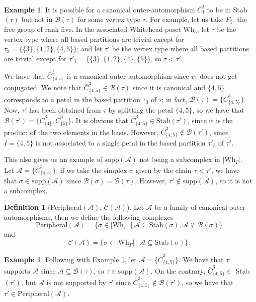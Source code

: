 \documentclass[a4paper]{amsart}
\newcommand{\G}{\Gamma}
\newcommand{\B}{\mathcal{B}}
\newcommand{\au}{\mathcal{A}}
\newcommand{\Wh}{\mathrm{Wh}}
\newcommand{\supp}{\mathrm{supp}}
\newcommand{\peri}{\mathrm{Peripheral}}
\newcommand{\Stab}{\mathrm{Stab}}
\theoremstyle{definition}
\newtheorem{defi}[teo]{Definition}
\newtheorem{ej}[teo]{Example}
\theoremstyle{remark}
\begin{document}
\begin{ej}
    It is possible for a canonical outer-automorphism $\bar{C}_{I}^j$ to be in Stab$(\tau)$ but not in $\B(\tau)$ for some vertex type $\tau$. For example, let us take $F_5$, the free group  of rank five. In the associated Whitehead poset $\Wh_5$, let $\tau$ be the vertex type where all  based partitions are trivial except for $\tau_3=\{\{3\},\{1,2\},\{4,5\}\}$; and let $\tau'$ be the vertex type where all  based partitions are trivial except for $\tau'_3=\{\{3\},\{1,2\},\{4\},\{5\}\}$, so $\tau<\tau'$. 
    
    We have that $\bar{C}_{\{4,5\}}^3$ is a canonical outer-automorphism since $v_1$ does not get conjugated. We note that $\bar{C}_{\{4,5\}}^3\in\B(\tau)$ since it is canonical and $\{4,5\}$ corresponds to a petal in the based partition $\tau_3$ of $\tau$; in fact, $\B(\tau)=\{\bar{C}_{\{4,5\}}^3\}$. Now, $\tau'$ has been obtained from $\tau$ by splitting the petal $\{4,5\}$, so we have that $\B(\tau')=\{\bar{C}_{\{4\}}^3,\bar{C}_{\{5\}}^3\}$. It is obvious that $\bar{C}_{\{4,5\}}^3\in\Stab(\tau')$, since it is the product of the two elements in the basis. However, $\bar{C}_{\{4,5\}}^3\notin\B(\tau')$, since $I=\{4,5\}$ is not associated to a single petal in the based partition $\tau'_3$ of $\tau'$.

   This also gives us an example of $\supp(\au)$ not being a subcomplex in $|\Wh_\G|$. Let $\au=\{\bar{C}_{\{4,5\}}^3\}$; if we take the simplex $\sigma$ given by the chain $\tau<\tau'$, we have that $\sigma\in\supp(\au)$ since $\B(\sigma)=\B(\tau)$. However, $\tau'\notin \supp(\au)$, so it is not a subcomplex. \label{ej:suppNotSub}
\end{ej}



\begin{defi}[Peripheral$(\au)$, $\mathcal{C}(\au)$]
    Let $\au$ be a family of canonical outer-automorphisms, then we define the following complexes
    $$
\peri(\au)=\{\sigma\in |\Wh_\G|\ |\ \au\subseteq \Stab(\sigma), \au\nsubseteq \B(\sigma)\}
    $$
    and 
    $$
\mathcal{C}(\au)=\{\sigma\in |\Wh_\G|\ |\ \au\subseteq \Stab(\sigma)\}.
    $$
\end{defi}

\begin{ej}
    Following with   Example \ref{ej:suppNotSub}, let $\au=\{\bar{C}_{\{4,5\}}^3\}$. We have that $\tau$ supports $\au$ since $\au\subseteq\B(\tau)$, so $\tau\in\supp(\au)$. On the contrary, $\bar{C}_{\{4,5\}}^3\in$ Stab$(\tau')$, but $\au$ is not supported by $\tau'$ since $\bar{C}_{\{4,5\}}^3\notin\B(\tau')$, so we have that $\tau'\in\peri(\au)$.
\end{ej}
\end{document}
